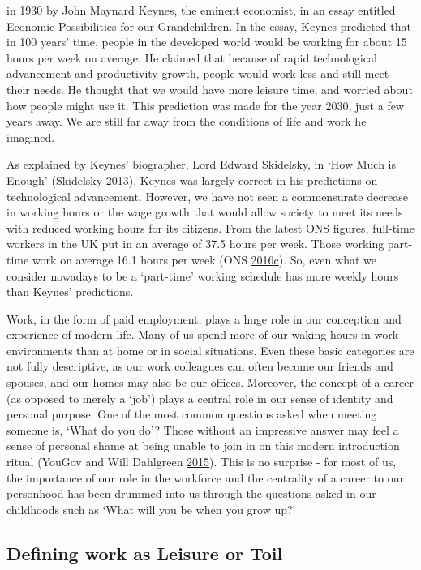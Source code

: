 \documentclass[]{tufte-handout}
\begin{document}
in 1930 by John Maynard Keynes, the
eminent economist, in an essay entitled Economic Possibilities for our
Grandchildren. In the essay, Keynes predicted that in 100 years' time,
people in the developed world would be working for about 15 hours per
week on average. He claimed that because of rapid technological
advancement and productivity growth, people would work less and still
meet their needs. He thought that we would have more leisure time, and
worried about how people might use it. This prediction was made for the
year 2030, just a few years away. We are still far away from the
conditions of life and work he imagined.

As explained by Keynes' biographer, Lord Edward Skidelsky, in `How Much
is Enough' (Skidelsky \protect\hyperlink{ref-Skidelsky2013}{2013}),
Keynes was largely correct in his predictions on technological
advancement. However, we have not seen a commensurate decrease in
working hours or the wage growth that would allow society to meet its
needs with reduced working hours for its citizens. From the latest ONS
figures, full-time workers in the UK put in an average of 37.5 hours per
week. Those working part-time work on average 16.1 hours per week (ONS
\protect\hyperlink{ref-ONS2016b}{2016}\protect\hyperlink{ref-ONS2016b}{c}).
So, even what we consider nowadays to be a `part-time' working schedule
has more weekly hours than Keynes' predictions.

Work, in the form of paid employment, plays a huge role in our
conception and experience of modern life. Many of us spend more of our
waking hours in work environments than at home or in social situations.
Even these basic categories are not fully descriptive, as our work
colleagues can often become our friends and spouses, and our homes may
also be our offices. Moreover, the concept of a career (as opposed to
merely a `job') plays a central role in our sense of identity and
personal purpose. One of the most common questions asked when meeting
someone is, `What do you do'? Those without an impressive answer may
feel a sense of personal shame at being unable to join in on this modern
introduction ritual (YouGov and Will Dahlgreen
\protect\hyperlink{ref-YouGov2015}{2015}). This is no surprise - for
most of us, the importance of our role in the workforce and the
centrality of a career to our personhood has been drummed into us
through the questions asked in our childhoods such as `What will you be
when you grow up?'

\hypertarget{defining-work-as-leisure-or-toil}{%
\subsection{Defining work as Leisure or
Toil}\label{defining-work-as-leisure-or-toil}}
\end{document}

